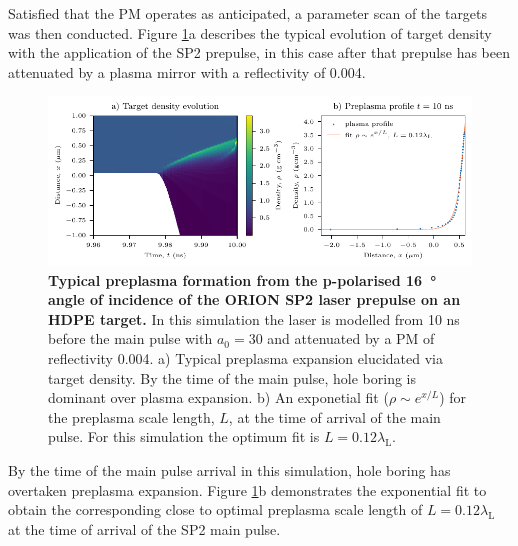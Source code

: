 Satisfied that the PM operates as anticipated, a parameter scan of the targets was then conducted. Figure \ref{fig:oriontargetpreplasma}a describes the typical evolution of target density with the application of the SP2 prepulse, in this case after that prepulse has been attenuated by a plasma mirror with a reflectivity of 0.004.
\begin{figure}
	\centering
	\includegraphics{figures/orion/orion_target_preplasma}
	\caption[Typical preplasma formation from the incidence of the ORION SP2 laser prepulse on a plastic target.]{\textbf{Typical preplasma formation from the p-polarised \qty{16}{\degree} angle of incidence of the ORION SP2 laser prepulse on an HDPE target.} In this simulation the laser is modelled from 10 ns before the main pulse with $a_0 = 30$ and attenuated by a PM of reflectivity 0.004. a) Typical preplasma expansion elucidated via target density. By the time of the main pulse, hole boring is dominant over plasma expansion. b) An exponetial fit ($\rho \sim e^{x/L}$) for the preplasma scale length, $L$, at the time of arrival of the main pulse. For this simulation the optimum fit is $L = 0.12 \lambda_\mathrm{L}$.}
	\label{fig:oriontargetpreplasma}
\end{figure}
By the time of the main pulse arrival in this simulation, hole boring has overtaken preplasma expansion. Figure \ref{fig:oriontargetpreplasma}b demonstrates the exponential fit to obtain the corresponding close to optimal preplasma scale length of $L = 0.12 \lambda_\mathrm{L}$ at the time of arrival of the SP2 main pulse.

